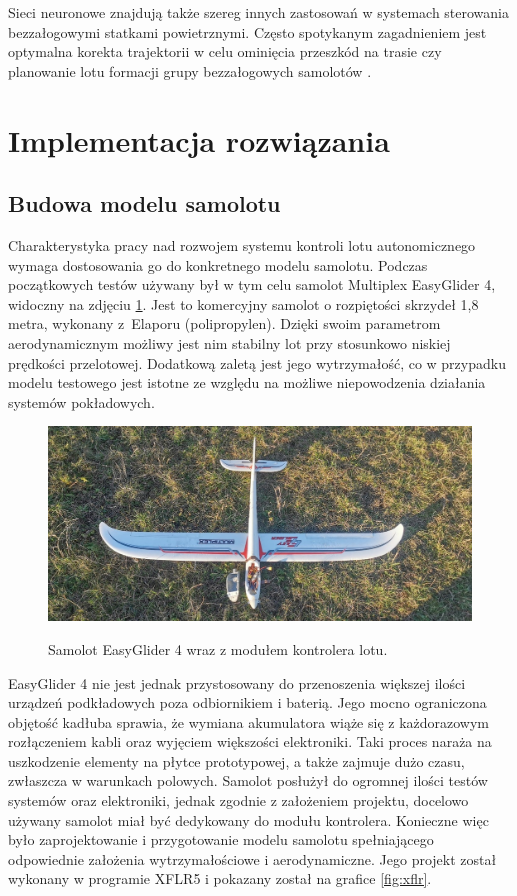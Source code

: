 \documentclass[12pt, a4paper]{article}
\begin{document}
Sieci neuronowe znajdują także szereg innych zastosowań w systemach sterowania bezzałogowymi statkami powietrznymi. Często spotykanym zagadnieniem jest optymalna korekta trajektorii w celu ominięcia przeszkód na trasie \cite{Wu2022} czy planowanie lotu  formacji grupy bezzałogowych samolotów \cite{IEEE2017}.

\clearpage
\section{Implementacja rozwiązania}
\subsection{Budowa modelu samolotu}
Charakterystyka pracy nad rozwojem systemu kontroli lotu autonomicznego wymaga dostosowania go do konkretnego modelu samolotu. Podczas początkowych testów używany był w tym celu samolot Multiplex EasyGlider 4, widoczny na zdjęciu \ref{fig:eg4}. Jest to komercyjny samolot o rozpiętości skrzydeł 1,8 metra, wykonany z~Elaporu (polipropylen). Dzięki swoim parametrom aerodynamicznym możliwy jest nim stabilny lot przy stosunkowo niskiej prędkości przelotowej. Dodatkową zaletą jest jego wytrzymałość, co w przypadku modelu testowego jest istotne ze względu na możliwe niepowodzenia działania systemów pokładowych.

\begin{figure}[ht]
    \centering
    \includegraphics[width=1\textwidth]{budowa1}\\
    \caption{Samolot EasyGlider 4 wraz z modułem kontrolera lotu.}
    \label{fig:eg4}
\end{figure}

EasyGlider 4 nie jest jednak przystosowany do przenoszenia większej ilości urządzeń podkładowych poza odbiornikiem i baterią. Jego mocno ograniczona objętość kadłuba sprawia, że wymiana akumulatora wiąże się z każdorazowym rozłączeniem kabli oraz wyjęciem większości elektroniki. Taki proces naraża na uszkodzenie elementy na płytce prototypowej, a także zajmuje dużo czasu, zwłaszcza w warunkach polowych. Samolot posłużył do ogromnej ilości testów systemów oraz elektroniki, jednak zgodnie z założeniem projektu, docelowo używany samolot miał być dedykowany do modułu kontrolera. Konieczne więc było zaprojektowanie i przygotowanie modelu samolotu spełniającego odpowiednie założenia wytrzymałościowe i aerodynamiczne. Jego projekt został wykonany w programie XFLR5 i pokazany został na grafice \ref{fig:xflr}.
\end{document}
